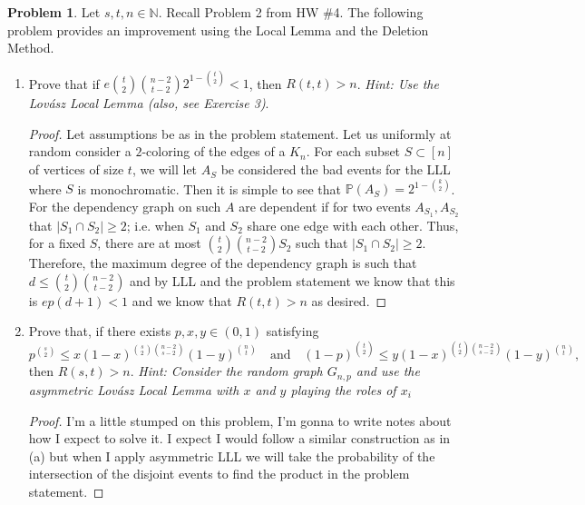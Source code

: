 \documentclass[11pt, letter]{amsart}
\theoremstyle{definition}
\newtheorem{problem}{Problem}[]
\newcommand{\p}[0]{\mathbb{P}}
\begin{document}
\begin{problem}
  Let $s,t,n \in \mathbb N$.  Recall Problem 2 from HW \#4.  The following problem provides an improvement using the Local Lemma and the Deletion Method.
  \begin{enumerate}[label=(\alph*)]
  \item\label{ramsey-symmetricLLL} Prove that if $e\binom{t}{2}\binom{n - 2}{t - 2}2^{1 - \binom{t}{2}} < 1$, then $R(t, t) > n$.  \textit{Hint: Use the Lov\'asz Local Lemma (also, see Exercise 3)}.

    \begin{proof}
        Let assumptions be as in the problem statement. Let us uniformly at random consider a $2$-coloring of the edges of a $K_n$. For each subset $S\subset [n]$ of vertices of size $t$, we will let $A_S$ be considered the bad events for the LLL where $S$ is monochromatic. Then it is simple to see that $\p (A_S) = 2^{1-\binom{k}{2}}$. For the dependency graph on such $A$ are dependent if for two events $A_{S_1}, A_{S_2}$ that $|S_1\cap S_2| \geq 2$; i.e. when $S_1$ and $S_2$ share one edge with each other. Thus, for a fixed $S$, there are at most $\binom{t}{2}\binom{n-2}{t-2}S_2$ such that $|S_1\cap S_2| \geq 2$. Therefore, the maximum degree of the dependency graph is such that $d \leq \binom{t}{2}\binom{n-2}{t-2}$ and by LLL and the problem statement we know that this is $ep(d+1) < 1$ and we know that $R(t, t) > n$ as desired.
    \end{proof}

  \item\label{ramsey-asymmetricLLL} Prove that, if there exists $p,x,y\in (0, 1)$ satisfying
    \begin{equation*}
      p^{\binom{s}{2}} \leq x(1 - x)^{\binom{s}{2}\binom{n-2}{s - 2}}(1 - y)^{\binom{n}{t}}\quad\text{and}\quad(1 - p)^{\binom{t}{2}} \leq y (1 - x)^{\binom{t}{2} \binom{n-2}{s-2}}(1 - y)^{\binom{n}{t}},
    \end{equation*}
    then $R(s, t) > n$.  \textit{Hint: Consider the random graph $G_{n,p}$ and use the asymmetric Lov\'asz Local Lemma with $x$ and $y$ playing the roles of $x_i$}

    \begin{proof}
        I'm a little stumped on this problem, I'm gonna to write notes about how I expect to solve it. I expect I would follow a similar construction as in (a) but when I apply asymmetric LLL we will take the probability of the intersection of the disjoint events to find the product in the problem statement.
    \end{proof}
    

\end{enumerate}
\end{problem}
\end{document}
